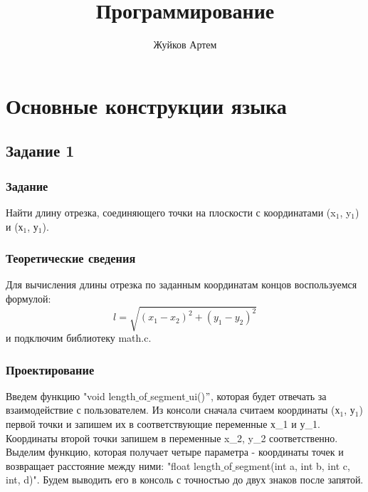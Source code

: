 \documentclass[12pt,a4paper]{report}
\author{Жуйков Артем}
\title{Программирование}
\begin{document}
\maketitle
\chapter{Основные конструкции языка}
\section{Задание 1}
\subsection{Задание}
Найти длину отрезка, соединяющего точки на плоскости с координатами (x$_1$, y$_1$) и (х$_1$, у$_1$).

\subsection{Теоретические сведения}


Для вычисления длины отрезка по заданным координатам концов воспользуемся формулой:
\begin{equation}
l = \sqrt{(x_1 - x_2)^2 + (y_1 - y_2)^2}
\end{equation}
и подключим библиотеку math.c.

\subsection{Проектирование}
Введем функцию "void length$\_$of$\_$segment$\_$ui()$"$, которая будет отвечать за взаимодействие с пользователем. Из консоли сначала считаем координаты (х$_1$, у$_1$) первой точки и запишем их в соответствующие переменные х\_1 и у\_1.
Координаты второй точки запишем в переменные x\_2, y\_2 соответственно.
Выделим функцию, которая получает четыре параметра - координаты точек и возвращает расстояние между ними: "float length$\_$of$\_$segment(int a, int b, int c, int, d)". Будем выводить его в консоль с точностью до двух знаков после запятой.
\end{document}

